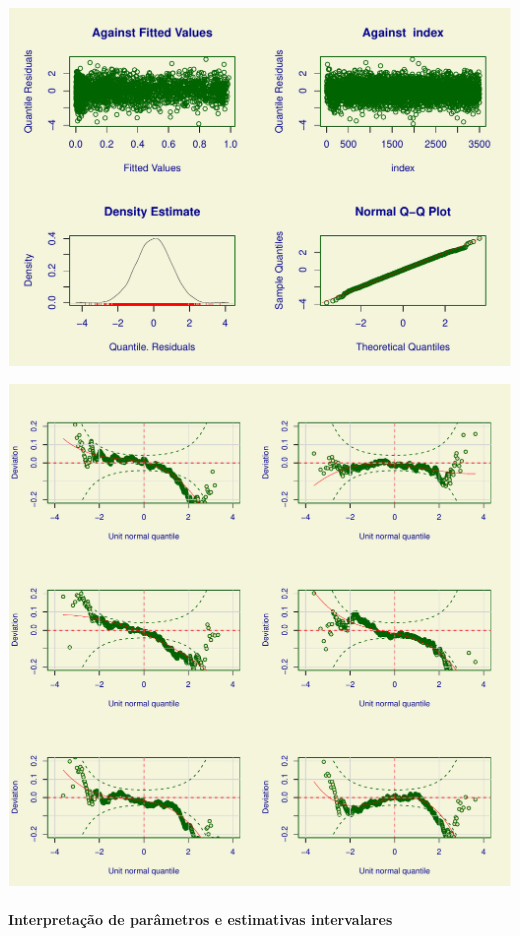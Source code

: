 \documentclass[
  11pt,
]{article}
\begin{document}
\begin{center}\includegraphics{lista3_files/figure-latex/unnamed-chunk-13-1} \end{center}

\begin{center}\includegraphics{lista3_files/figure-latex/unnamed-chunk-14-1} \end{center}

\hypertarget{interpretauxe7uxe3o-de-paruxe2metros-e-estimativas-intervalares-1}{%
\paragraph{Interpretação de parâmetros e estimativas intervalares}\label{interpretauxe7uxe3o-de-paruxe2metros-e-estimativas-intervalares-1}}
\end{document}
